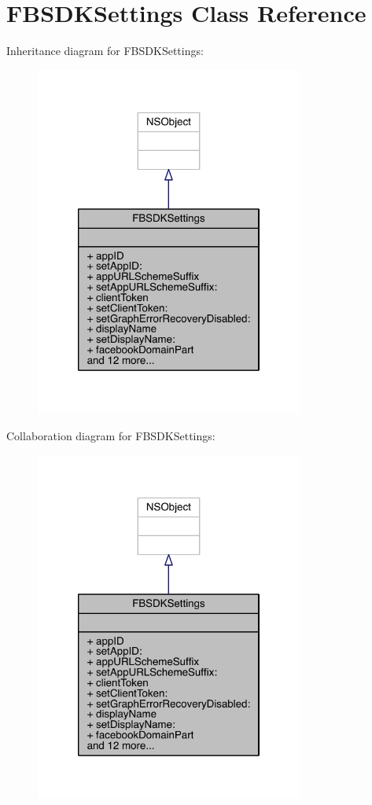 \hypertarget{interface_f_b_s_d_k_settings}{\section{F\-B\-S\-D\-K\-Settings Class Reference}
\label{interface_f_b_s_d_k_settings}
}


Inheritance diagram for F\-B\-S\-D\-K\-Settings\-:
\nopagebreak
\begin{figure}[H]
\begin{center}
\leavevmode
\includegraphics[width=250pt]{interface_f_b_s_d_k_settings__inherit__graph}
\end{center}
\end{figure}


Collaboration diagram for F\-B\-S\-D\-K\-Settings\-:
\nopagebreak
\begin{figure}[H]
\begin{center}
\leavevmode
\includegraphics[width=250pt]{interface_f_b_s_d_k_settings__coll__graph}
\end{center}
\end{figure}
